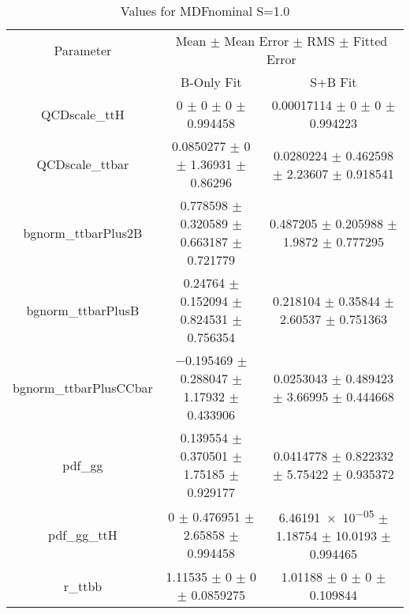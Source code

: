 \begin{table}
\centering
\caption{Values for MDFnominal S=1.0}
\begin{tabular}{ccc}
\toprule
Parameter & \multicolumn{2}{c}{Mean $\pm$ Mean Error $\pm$ RMS $\pm$ Fitted Error}\\
 & B-Only Fit & S+B Fit\\
\midrule
QCDscale\_ttH & \num{0} $\pm$ \num{0} $\pm$ \num{0} $\pm$ \num{0.994458} & \num{0.00017114} $\pm$ \num{0} $\pm$ \num{0} $\pm$ \num{0.994223}\\
QCDscale\_ttbar & \num{0.0850277} $\pm$ \num{0} $\pm$ \num{1.36931} $\pm$ \num{0.86296} & \num{0.0280224} $\pm$ \num{0.462598} $\pm$ \num{2.23607} $\pm$ \num{0.918541}\\
bgnorm\_ttbarPlus2B & \num{0.778598} $\pm$ \num{0.320589} $\pm$ \num{0.663187} $\pm$ \num{0.721779} & \num{0.487205} $\pm$ \num{0.205988} $\pm$ \num{1.9872} $\pm$ \num{0.777295}\\
bgnorm\_ttbarPlusB & \num{0.24764} $\pm$ \num{0.152094} $\pm$ \num{0.824531} $\pm$ \num{0.756354} & \num{0.218104} $\pm$ \num{0.35844} $\pm$ \num{2.60537} $\pm$ \num{0.751363}\\
bgnorm\_ttbarPlusCCbar & \num{-0.195469} $\pm$ \num{0.288047} $\pm$ \num{1.17932} $\pm$ \num{0.433906} & \num{0.0253043} $\pm$ \num{0.489423} $\pm$ \num{3.66995} $\pm$ \num{0.444668}\\
pdf\_gg & \num{0.139554} $\pm$ \num{0.370501} $\pm$ \num{1.75185} $\pm$ \num{0.929177} & \num{0.0414778} $\pm$ \num{0.822332} $\pm$ \num{5.75422} $\pm$ \num{0.935372}\\
pdf\_gg\_ttH & \num{0} $\pm$ \num{0.476951} $\pm$ \num{2.65858} $\pm$ \num{0.994458} & \num{6.46191e-05} $\pm$ \num{1.18754} $\pm$ \num{10.0193} $\pm$ \num{0.994465}\\
r\_ttbb & \num{1.11535} $\pm$ \num{0} $\pm$ \num{0} $\pm$ \num{0.0859275} & \num{1.01188} $\pm$ \num{0} $\pm$ \num{0} $\pm$ \num{0.109844}\\
\bottomrule
\end{tabular}
\end{table}